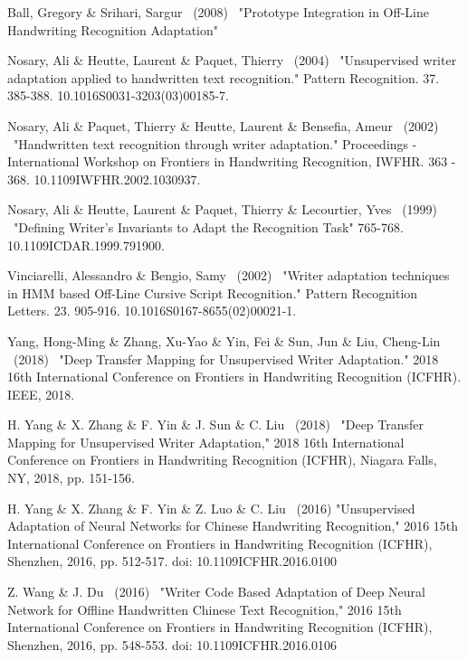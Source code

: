 \documentclass{article}
\begin{document}
\begin{thebibliography}{99}
   Ball, Gregory \& Srihari, Sargur \ (2008) \ "Prototype Integration in Off-Line Handwriting Recognition Adaptation"

   Nosary, Ali \& Heutte, Laurent \& Paquet, Thierry \ (2004) \ "Unsupervised writer adaptation applied to handwritten text recognition." Pattern Recognition. 37. 385-388. 10.1016\/S0031-3203(03)00185-7. 

   Nosary, Ali \& Paquet, Thierry \& Heutte, Laurent \& Bensefia, Ameur \ (2002) \ "Handwritten text recognition through writer adaptation." Proceedings - International Workshop on Frontiers in Handwriting Recognition, IWFHR. 363 - 368. 10.1109\/IWFHR.2002.1030937. 

   Nosary, Ali \& Heutte, Laurent \& Paquet, Thierry \& Lecourtier, Yves \ (1999) \ "Defining Writer's Invariants to Adapt the Recognition Task" 765-768. 10.1109\/ICDAR.1999.791900. 

   Vinciarelli, Alessandro \& Bengio, Samy \ (2002) \ "Writer adaptation techniques in HMM based Off-Line Cursive Script Recognition." Pattern Recognition Letters. 23. 905-916. 10.1016\/S0167-8655(02)00021-1. 

   Yang, Hong-Ming \& Zhang, Xu-Yao \& Yin, Fei \& Sun, Jun \& Liu, Cheng-Lin \ (2018) \ "Deep Transfer Mapping for Unsupervised Writer Adaptation." 2018 16th International Conference on Frontiers in Handwriting Recognition (ICFHR). IEEE, 2018.

   H. Yang \& X. Zhang \& F. Yin \& J. Sun \& C. Liu \ (2018) \ "Deep Transfer Mapping for Unsupervised Writer Adaptation," 2018 16th International Conference on Frontiers in Handwriting Recognition (ICFHR), Niagara Falls, NY, 2018, pp. 151-156.

   H. Yang \& X. Zhang \& F. Yin \& Z. Luo \& C. Liu \ (2016)  "Unsupervised Adaptation of Neural Networks for Chinese Handwriting Recognition," 2016 15th International Conference on Frontiers in Handwriting Recognition (ICFHR), Shenzhen, 2016, pp. 512-517. doi: 10.1109\/ICFHR.2016.0100

   Z. Wang \& J. Du \ (2016) \  "Writer Code Based Adaptation of Deep Neural Network for Offline Handwritten Chinese Text Recognition," 2016 15th International Conference on Frontiers in Handwriting Recognition (ICFHR), Shenzhen, 2016, pp. 548-553. doi: 10.1109\/ICFHR.2016.0106


\end{thebibliography}
\end{document}
